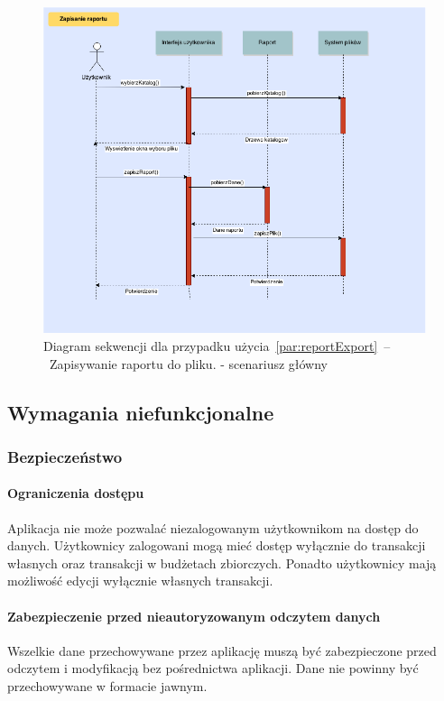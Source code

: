\begin{figure}[H]
    \includegraphics[width=\textwidth,
    height=0.5\textheight]{images/raport_export.png}
    \caption{Diagram sekwencji dla przypadku użycia~\ref{par:reportExport}~--~Zapisywanie raportu do pliku.
    - scenariusz główny}
\end{figure}

\newpage
\subsection{Wymagania niefunkcjonalne}
\subsubsection{Bezpieczeństwo}

\paragraph{Ograniczenia dostępu\newline}
Aplikacja nie może pozwalać niezalogowanym użytkownikom na dostęp do danych. Użytkownicy zalogowani mogą mieć dostęp wyłącznie do transakcji własnych oraz transakcji w budżetach zbiorczych. Ponadto użytkownicy mają możliwość edycji wyłącznie własnych transakcji.

\paragraph{Zabezpieczenie przed nieautoryzowanym odczytem danych\newline}
Wszelkie dane przechowywane przez aplikację muszą być zabezpieczone przed odczytem i modyfikacją bez pośrednictwa aplikacji. Dane nie powinny być przechowywane w formacie jawnym.

